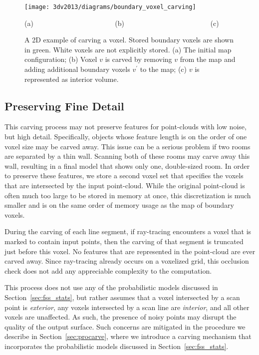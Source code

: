 \documentclass[12pt,onecolumn,oneside]{book}
\begin{document}
\begin{figure}[t]

  \centerline{\texttt{[image: 3dv2013/diagrams/boundary\_voxel\_carving]}}
  \centerline{(a)\,\,\,\,\,\,\,\,\,\,\,\,\,\,\,\,\,\,\,\,\,\,\,\,\,\,\,\,\,\,\,\,\,\,\,\,\,\,\,\,\,\,\,\,\,\,\,\,\,\,\,\,\,\,\,\,\,\,\,\,\,\,\,\,\,\,\,\,\,\,(b)\,\,\,\,\,\,\,\,\,\,\,\,\,\,\,\,\,\,\,\,\,\,\,\,\,\,\,\,\,\,\,\,\,\,\,\,\,\,\,\,\,\,\,\,\,\,\,\,\,\,\,\,\,\,\,\,\,\,\,\,\,\,\,\,\,\,\,\,\,\,\,\,\,\,(c)\,\,\,\,\,}
\caption[A 2D example of carving a voxel.]{A 2D example of carving a voxel.  Stored boundary voxels are shown in green.  White voxels are not explicitly stored. (a) The initial map configuration; (b) Voxel $v$ is carved by removing $v$ from the map and adding additional boundary voxels $v^{\prime}$ to the map; (c) $v$ is represented as interior volume.}
\label{fig:dgrid_boundary_carving}
\end{figure}

\subsection{Preserving Fine Detail}
\label{ssec:voxel_carving_preserving_detail}

This carving process may not preserve features for point-clouds with low noise, but high detail.  Specifically, objects whose feature length is on the order of one voxel size may be carved away.  This issue can be a serious problem if two rooms are separated by a thin wall.  Scanning both of these rooms may carve away this wall, resulting in a final model that shows only one, double-sized room.  In order to preserve these features, we store a second voxel set that specifies the voxels that are intersected by the input point-cloud.  While the original point-cloud is often much too large to be stored in memory at once, this discretization is much smaller and is on the same order of memory usage as the map of boundary voxels.

During the carving of each line segment, if ray-tracing encounters a voxel that is marked to contain input points, then the carving of that segment is truncated just before this voxel.  No features that are represented in the point-cloud are ever carved away.  Since ray-tracing already occurs on a voxelized grid, this occlusion check does not add any appreciable complexity to the computation.

This process does not use any of the probabilistic models discussed in Section~\ref{sec:fss_stats}, but rather assumes that a voxel intersected by a scan point is {\it exterior}, any voxels intersected by a scan line are {\it interior}, and all other voxels are unaffected.  As such, the presence of noisy points may disrupt the quality of the output surface.  Such concerns are mitigated in the procedure we describe in Section~\ref{sec:procarve}, where we introduce a carving mechanism that incorporates the probabilistic models discussed in Section~\ref{sec:fss_stats}.
\end{document}
